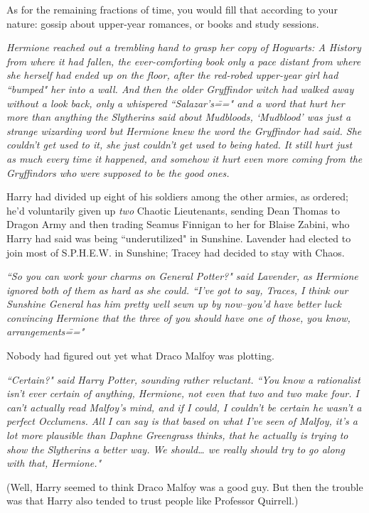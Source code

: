 As for the remaining fractions of time, you would fill that according to your nature: gossip about upper-year romances, or books and study sessions.

\emph{Hermione reached out a trembling hand to grasp her copy of \emph{Hogwarts: A History} from where it had fallen, the ever-comforting book only a pace distant from where she herself had ended up on the floor, after the red-robed upper-year girl had ``bumped" her into a wall. And then the older Gryffindor witch had walked away without a look back, only a whispered \mbox{``Salazar's\==="} and a word that hurt her more than anything the Slytherins said about Mudbloods, `Mudblood' was just a strange wizarding word but Hermione knew the word the Gryffindor had said. She couldn't get used to it, she just couldn't get used to being hated. It still hurt just as much every time it happened, and somehow it hurt even more coming from the Gryffindors who were \emph{supposed} to be the good ones.}

Harry had divided up eight of his soldiers among the other armies, as ordered; he'd voluntarily given up \emph{two} Chaotic Lieutenants, sending Dean Thomas to Dragon Army and then trading Seamus Finnigan to her for Blaise Zabini, who Harry had said was being ``underutilized" in Sunshine. Lavender had elected to join most of S.P.H.E.W. in Sunshine; Tracey had decided to stay with Chaos.

\emph{``So you can work your charms on General Potter?" said Lavender, as Hermione ignored both of them as hard as she could. ``I've got to say, Traces, I think our Sunshine General has him pretty well sewn up by now\---you'd have better luck convincing Hermione that the three of you should have one of those, you know, arrangements\==="}

Nobody had figured out yet what Draco Malfoy was plotting.

\emph{``Certain?" said Harry Potter, sounding rather reluctant. ``You know a rationalist isn't ever certain of anything, Hermione, not even that two and two make four. I can't actually read Malfoy's mind, and if I could, I couldn't be certain he wasn't a perfect Occlumens. All I can say is that based on what I've seen of Malfoy, it's a lot more plausible than Daphne Greengrass thinks, that he actually is trying to show the Slytherins a better way. We should{\ldots} we really should try to go along with that, Hermione."}

(Well, Harry seemed to think Draco Malfoy was a good guy. But then the trouble was that Harry also tended to trust people like Professor Quirrell.)

